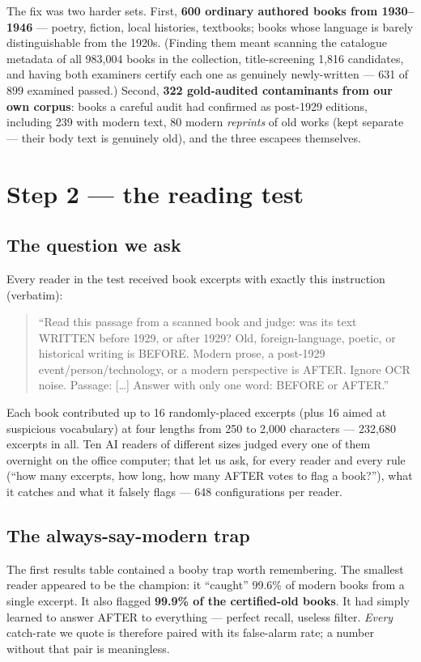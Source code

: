 \documentclass[11pt]{article}
\newenvironment{example}{\begin{quote}\small\begin{sffamily}}{\end{sffamily}\end{quote}}
\begin{document}
The fix was two harder sets. First, \textbf{600 ordinary authored books from 1930--1946} --- poetry,
fiction, local histories, textbooks; books whose language is barely distinguishable from the 1920s.
(Finding them meant scanning the catalogue metadata of all 983{,}004 books in the collection, title-screening
1{,}816 candidates, and having both examiners certify each one as genuinely newly-written --- 631 of
899 examined passed.) Second, \textbf{322 gold-audited contaminants from our own corpus}: books a
careful audit had confirmed as post-1929 editions, including 239 with modern text, 80 modern
\emph{reprints} of old works (kept separate --- their body text is genuinely old), and the three
escapees themselves.

\section{Step 2 --- the reading test}
\subsection{The question we ask}
Every reader in the test received book excerpts with exactly this instruction (verbatim):

\begin{example}
``Read this passage from a scanned book and judge: was its text WRITTEN before 1929, or after 1929?
Old, foreign-language, poetic, or historical writing is BEFORE. Modern prose, a post-1929
event/person/technology, or a modern perspective is AFTER. Ignore OCR noise. Passage: [\ldots]
Answer with only one word: BEFORE or AFTER.''
\end{example}

Each book contributed up to 16 randomly-placed excerpts (plus 16 aimed at suspicious vocabulary) at
four lengths from 250 to 2{,}000 characters --- 232{,}680 excerpts in all. Ten AI readers of different
sizes judged every one of them overnight on the office computer; that let us ask, for every reader and
every rule (``how many excerpts, how long, how many AFTER votes to flag a book?''), what it catches
and what it falsely flags --- 648 configurations per reader.

\subsection{The always-say-modern trap}
The first results table contained a booby trap worth remembering. The smallest reader appeared to be
the champion: it ``caught'' 99.6\% of modern books from a single excerpt. It also flagged
\textbf{99.9\% of the certified-old books}. It had simply learned to answer AFTER to everything ---
perfect recall, useless filter. \emph{Every} catch-rate we quote is therefore paired with its
false-alarm rate; a number without that pair is meaningless.
\end{document}
